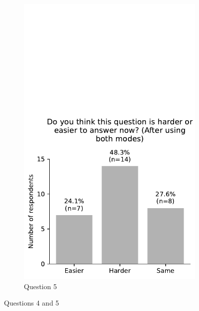 \begin{figure}[H]
\begin{subfigure}[b]{0.5\textwidth}
		\includegraphics[width=\textwidth]{images/questionnaire/4.pdf}
		\caption{Question 5}
		\label{fig:Question 5}
	\end{subfigure}%
	\caption{Questions 4 and 5}
	\label{fig:Questions 4 and 5}
\end{figure}



